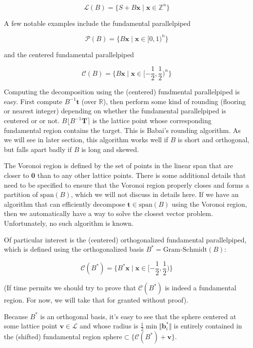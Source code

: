 \documentclass[letterpaper,12pt]{article}
\begin{document}
$$
\mathcal{L}(B) = \{S + B\mathbf{x} \mid \mathbf{x} \in \mathbb{Z}^n\}
$$

A few notable examples include the fundamental parallelpiped 

$$
\mathcal{P}(B) = \{B\mathbf{x} \mid \mathbf{x} \in [0, 1)^n\}
$$

and the centered fundamental parallelpiped

$$
\mathcal{C}(B) = \{B\mathbf{x} \mid \mathbf{x} \in [-\frac{1}{2}, \frac{1}{2})^n\}
$$

Computing the decomposition using the (centered) fundmental parallelpiped is easy. First compute $B^{-1}\mathbf{t}$ (over $\mathbb{R}$), then perform some kind of rounding (flooring or nearest integer) depending on whether the fundamental parallelpiped is centered or or not. $B\lfloor B^{-1}\mathbf{T} \rceil$ is the lattice point whose corresponding fundamental region contains the target. This is Babai's rounding algorithm. As we will see in later section, this algorithm works well if $B$ is short and orthogonal, but falls apart badly if $B$ is long and skewed.

The Voronoi region is defined by the set of points in the linear span that are closer to $\mathbf{0}$ than to any other lattice points. There is some additional details that need to be specified to ensure that the Voronoi region properly closes and forms a partition of $\text{span}(B)$, which we will not discuss in details here. If we have an algorithm that can efficiently decompose $\mathbf{t} \in \text{span}(B)$ using the Voronoi region, then we automatically have a way to solve the closest vector problem. Unfortunately, no such algorithm is known.

Of particular interest is the (centered) orthogonalized fundamental parallelpiped, which is defined using the orthogonalized basis $B^\ast = \text{Gram-Schmidt}(B)$:

$$
\mathcal{C}(B^\ast) = \{B^\ast\mathbf{x} \mid \mathbf{x} \in [-\frac{1}{2}, \frac{1}{2})\}
$$

(If time permits we should try to prove that $\mathcal{C}(B^\ast)$ is indeed a fundamental region. For now, we will take that for granted without proof).

Because $B^\ast$ is an orthogonal basis, it's easy to see that the sphere centered at some lattice point $\mathbf{v} \in \mathcal{L}$ and whose radius is $\frac{1}{2}\min \Vert \mathbf{b}_i^\ast\Vert$ is entirely contained in the (shifted) fundamental region $\text{sphere} \subset \{\mathcal{C}(B^\ast) + \mathbf{v}\}$.
\end{document}
